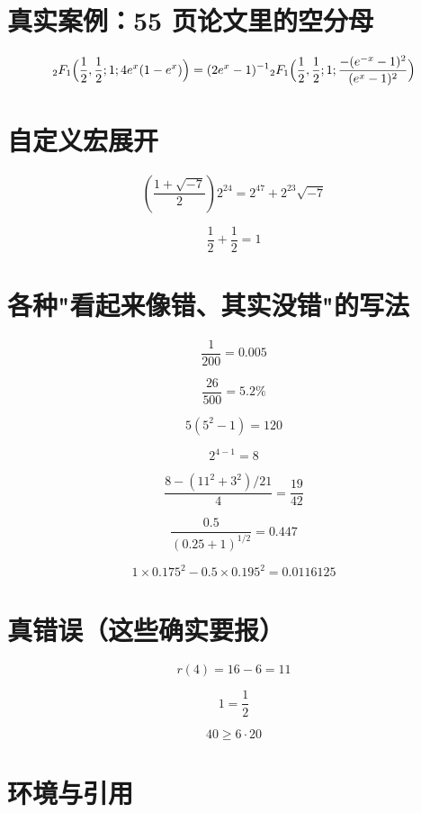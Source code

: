 \documentclass{article}
\newcommand{\hf}{\frac{1}{2}}
\def\sls#1#2{(\frac{#1}{#2})}
\begin{document}
\section{真实案例：55 页论文里的空分母}

\[
{}_{2}F_{1}\Bigl(\hf,\hf;1;4e^{x}(1-e^{x})\Bigr)=(2e^{x}-1)^{-1}
{}_{2}F_{1}\Bigl(\hf,\hf;1;\frac{-(e^{-x}-1)^{2}}{(e^{x}-1)^{2}}\Bigr)
\]

\section{自定义宏展开}

\[ \sls{1+\sqrt{-7}}{2}2^{24} = 2^{47}+2^{23}\sqrt{-7} \]

\[ \hf+\hf=1 \]

\section{各种"看起来像错、其实没错"的写法}

\[ \frac{1}{200}=0.005 \]

\[ \frac{26}{500}=5.2\% \]

\[ 5(5^{2}-1)=120 \]

\[ 2^{4-1}=8 \]

\[ \frac{8-(11^{2}+3^{2})/21}{4}=\frac{19}{42} \]

\[ \frac{0.5}{(0.25+1)^{1/2}}=0.447 \]

\[ 1\times 0.175^{2}-0.5\times 0.195^{2}=0.0116125 \]

\section{真错误（这些确实要报）}

\[ r(4)=16-6=11 \]

\[ 1=\frac{1}{2} \]

\[ 40\ge 6\cdot 20 \]

\section{环境与引用}
\end{document}
